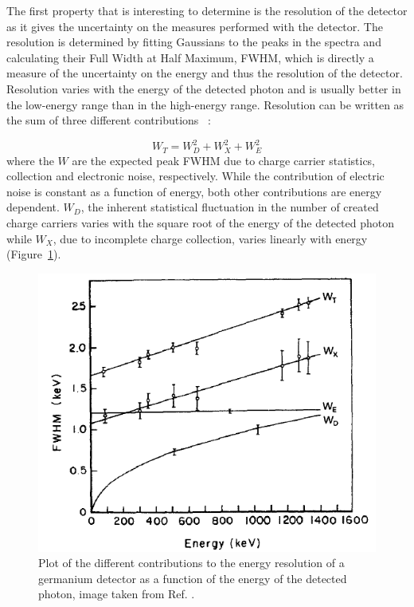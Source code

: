 \documentclass[11pt,a4paper]{article}
\begin{document}
The first property that is interesting to determine is the resolution of the detector as it gives the uncertainty on the measures performed with the detector. The resolution is determined by fitting Gaussians to the peaks in the spectra and calculating their Full Width at Half Maximum, FWHM, which is directly a measure of the uncertainty on the energy and thus the resolution of the detector. Resolution varies with the energy of the detected photon and is usually better in the low-energy range than in the high-energy range. Resolution can be written as the sum of three different contributions \cite{Tsoulfanidis}~:

\begin{equation}
W_T = W_D^2 + W_X^2 + W_E^2
\end{equation}
where the $W$ are the expected peak FWHM due to charge carrier statistics, collection and electronic noise, respectively. While the contribution of electric noise is constant as a function of energy, both other contributions are energy dependent. $W_D$, the inherent statistical fluctuation in the number of created charge carriers varies with the square root of the energy of the detected photon while $W_X$, due to incomplete charge collection, varies linearly with energy (Figure~\ref{resolution}).

\begin{figure}
\centering
\includegraphics[scale=0.9]{resolution.png}
\caption{Plot of the different contributions to the energy resolution of a germanium detector as a function of the energy of the detected photon, image taken from Ref. \cite{Knoll}.}
\label{resolution}
\end{figure}
\end{document}
